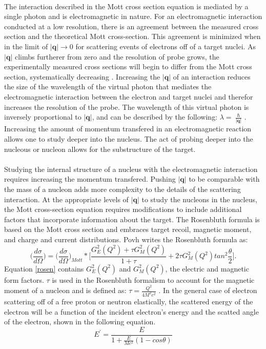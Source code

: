 \paragraph{}The interaction described in the Mott cross section equation is mediated by a single photon and is electromagnetic in nature. For an electromagnetic interaction conducted at a low resolution, there is an agreement between the measured cross section and the theoretical Mott cross-section. This agreement is minimized when in the limit of $|\boldsymbol{q}| \rightarrow  0$ for scattering events of electrons off of a target nuclei. As $|\boldsymbol{q}|$ climbs furtherer from zero and the resolution of probe grows, the experimentally measured cross sections will begin to differ from the Mott cross section, systematically decreasing \cite{PnN}. Increasing the $|\boldsymbol{q}|$ of an interaction reduces the size of the wavelength of the virtual photon that mediates the electromagnetic interaction between the electron and target nuclei and therefor increases the resolution of the probe. The wavelength of this virtual photon is inversely proportional to $|\boldsymbol{q}|$, and can be described by the following: $\lambda = \ \frac{\hbar}{|\boldsymbol{q}|}$ \cite{PnN}. Increasing the amount of momentum transfered in an electromagnetic reaction allows one to study deeper into the nucleus. The act of probing deeper into the nucleous or nucleon allows for the substructure of the target. 
\paragraph{} Studying the internal structure of a nucleus with the electromagnetic interaction requires increasing the momentum transfered. Pushing $|\boldsymbol{q}|$ to be comparable with the mass of a nucleon adds more complexity to the details of the scattering interaction. At the appropriate levels of $|\boldsymbol{q}|$ to study the nucleons in the nucleus, the Mott cross-section equation requires modifications to include additional factors that incorporate information about the target. The Rosenbluth formula is based on the Mott cross section and embraces target recoil, magnetic moment, and charge and current distributions. Povh writes the Rosenbluth formula as:
\begin{equation}
\label{rosen}
\bigg(\frac{d\sigma}{d\Omega}\bigg)=\bigg(\frac{d\sigma}{d\Omega}\bigg)_{Mott} *\bigg\lbrack \frac{G^2_E(Q^2) +\tau G^2_M(Q^2)}{1+\tau} + 2\tau G^2_M(Q^2)tan^2\frac{\theta}{2} \bigg\rbrack.
\end{equation}
Equation \ref{rosen} contains $G^2_E(Q^2)$ and $G^2_M(Q^2)$, the electric and magnetic form factors. $\tau$ is used in the Rosenbluth formalism to account for the magnetic moment of a nucleon and is defined as: $\tau = \frac{Q^2}{4M^2c^2}$ \cite{PnN}. In the general case of electron scattering off of a free proton or neutron elastically, the scattered energy of the electron will be a function of the incident electron's energy and the scatted angle of the electron, shown in the following equation.
\begin{equation}
E^\prime =\frac{E}{1+\frac{E}{Mc^2}(1-cos\theta)}
\end{equation}



